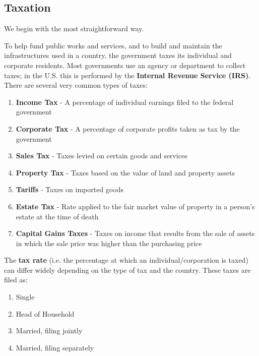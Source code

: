\documentclass{article}
\begin{document}
  \subsection{Taxation}

    We begin with the most straightforward way. 

    \begin{definition}[Taxes]
      \label{def:taxes}
      To help fund public works and services, and to build and maintain the infrastructures used in a country, the government taxes its individual and corporate residents. Most governments use an agency or department to collect taxes; in the U.S. this is performed by the \textbf{Internal Revenue Service (IRS)}. There are several very common types of taxes: 
      \begin{enumerate}
        \item \textbf{Income Tax} - A percentage of individual earnings filed to the federal government
        \item \textbf{Corporate Tax} - A percentage of corporate profits taken as tax by the government
        \item \textbf{Sales Tax} - Taxes levied on certain goods and services
        \item \textbf{Property Tax} - Taxes based on the value of land and property assets
        \item \textbf{Tariffs} - Taxes on imported goods
        \item \textbf{Estate Tax} - Rate applied to the fair market value of property in a person's estate at the time of death
        \item \textbf{Capital Gains Taxes} - Taxes on income that results from the sale of assets in which the sale price was higher than the purchasing price 
      \end{enumerate}
      The \textbf{tax rate} (i.e. the percentage at which an individual/corporation is taxed) can differ widely depending on the type of tax and the country. These taxes are filed as: 
      \begin{enumerate}
        \item Single
        \item Head of Household
        \item Married, filing jointly
        \item Married, filing separately 
      \end{enumerate}
    \end{definition}
\end{document}
